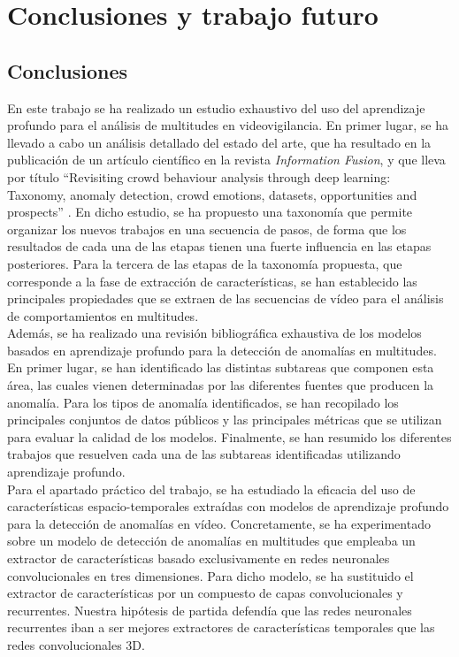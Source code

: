 \documentclass[../main.tex]{memoir}
\begin{document}
\chapter{Conclusiones y trabajo futuro}
\label{sec:conclusions-future-work}

\section{Conclusiones}

En este trabajo se ha realizado un estudio exhaustivo del uso del
aprendizaje profundo para el análisis de multitudes en
videovigilancia. En primer lugar, se ha llevado a cabo un análisis
detallado del estado del arte, que ha resultado en la publicación de
un artículo científico en la revista \textit{Information Fusion}, y
que lleva por título ``Revisiting crowd behaviour analysis through
deep learning: Taxonomy, anomaly detection, crowd emotions, datasets,
opportunities and prospects'' \cite{sanchez2020revisiting}. En dicho
estudio, se ha propuesto una taxonomía que permite organizar los
nuevos trabajos en una secuencia de pasos, de forma que los resultados
de cada una de las etapas tienen una fuerte influencia en las etapas
posteriores. Para la tercera de las etapas de la taxonomía propuesta,
que corresponde a la fase de extracción de características, se han
establecido las principales propiedades que se extraen de las
secuencias de vídeo para el análisis de comportamientos en multitudes.\\

Además, se ha realizado una revisión bibliográfica exhaustiva de los
modelos basados en aprendizaje profundo para la detección de anomalías
en multitudes. En primer lugar, se han identificado las distintas
subtareas que componen esta área, las cuales vienen determinadas por
las diferentes fuentes que producen la anomalía. Para los tipos de
anomalía identificados, se han recopilado los principales conjuntos de
datos públicos y las principales métricas que se utilizan para evaluar
la calidad de los modelos. Finalmente, se han resumido los diferentes
trabajos que resuelven cada una de las subtareas identificadas
utilizando aprendizaje profundo.\\

Para el apartado práctico del trabajo, se ha estudiado la eficacia del
uso de características espacio-temporales extraídas con modelos de
aprendizaje profundo para la detección de anomalías en
vídeo. Concretamente, se ha experimentado sobre un modelo de detección
de anomalías en multitudes que empleaba un extractor de
características basado exclusivamente en redes neuronales
convolucionales en tres dimensiones. Para dicho modelo, se ha
sustituido el extractor de características por un compuesto de capas
convolucionales y recurrentes. Nuestra hipótesis de partida defendía
que las redes neuronales recurrentes iban a ser mejores extractores de
características temporales que las redes convolucionales 3D.\\
\end{document}
